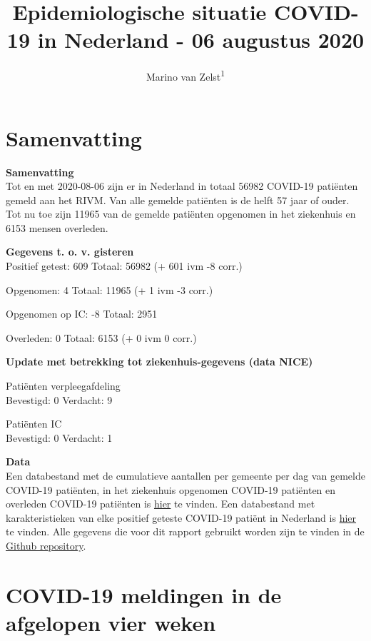 \documentclass[
  english,
  man,floatsintext]{apa6}
\title{Epidemiologische situatie COVID-19 in Nederland - 06 augustus 2020}
\author{Marino van Zelst\textsuperscript{1}}
\date{}
\affiliation{\vspace{0.5cm}\textsuperscript{1} -}
\begin{document}
\maketitle

{
\hypersetup{linkcolor=}
\setcounter{tocdepth}{3}
\tableofcontents
}
\newpage

\hypertarget{samenvatting}{%
\section{Samenvatting}\label{samenvatting}}

\textbf{Samenvatting}\\
Tot en met 2020-08-06 zijn er in Nederland in totaal 56982 COVID-19 patiënten gemeld aan het RIVM. Van alle gemelde patiënten is de helft 57 jaar of ouder. Tot nu toe zijn 11965 van de gemelde patiënten opgenomen in het ziekenhuis en 6153 mensen overleden.

\textbf{Gegevens t. o. v. gisteren}\\
Positief getest: 609
Totaal: 56982 (+ 601 ivm -8 corr.)

Opgenomen: 4
Totaal: 11965 (+
1 ivm -3 corr.)

Opgenomen op IC: -8
Totaal: 2951

Overleden: 0
Totaal: 6153 (+
0 ivm 0 corr.)

\textbf{Update met betrekking tot ziekenhuis-gegevens (data NICE)}

Patiënten verpleegafdeling\\
Bevestigd: 0 Verdacht: 9

Patiënten IC\\
Bevestigd: 0 Verdacht: 1

\textbf{Data}\\
Een databestand met de cumulatieve aantallen per gemeente per dag van gemelde COVID-19 patiënten, in het ziekenhuis opgenomen COVID-19 patiënten en overleden COVID-19 patiënten is \href{https://data.rivm.nl/geonetwork/srv/dut/catalog.search\#/metadata/1c0fcd57-1102-4620-9cfa-441e93ea5604}{hier} te vinden. Een databestand met karakteristieken van elke positief geteste COVID-19 patiënt in Nederland is \href{https://data.rivm.nl/geonetwork/srv/dut/catalog.search\#/metadata/2c4357c8-76e4-4662-9574-1deb8a73f724?tab=relations}{hier} te vinden. Alle gegevens die voor dit rapport gebruikt worden zijn te vinden in de \href{https://github.com/mzelst/covid-19}{Github repository}.

\newpage

\hypertarget{covid-19-meldingen-in-de-afgelopen-vier-weken}{%
\section{COVID-19 meldingen in de afgelopen vier weken}\label{covid-19-meldingen-in-de-afgelopen-vier-weken}}
\end{document}
